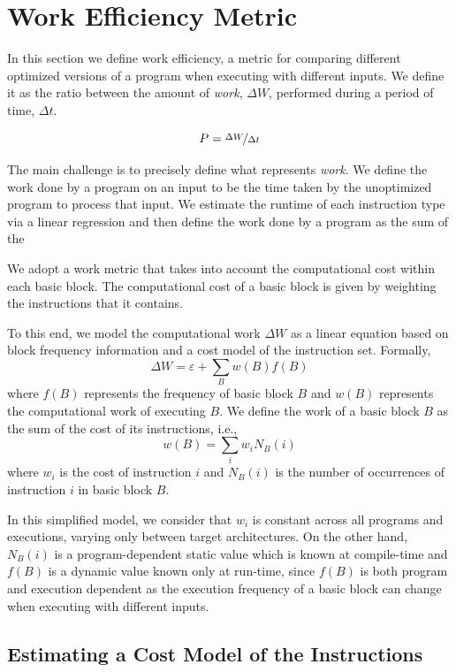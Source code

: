 \section{Work Efficiency Metric} \label{sec:metric}

In this section we define work efficiency, a metric for comparing different optimized versions of a program when executing with different
inputs. We define it as the ratio between the amount of \textit{work}, $\Delta W$, performed during a period of time, $\Delta t$.

\[
   P = \nicefrac{\Delta W}{\Delta t}
\]

The main challenge is to precisely define what represents \textit{work}. 
We define the work done by a program on an input to be the time taken by the unoptimized program to process that input.
We estimate the runtime of each instruction type via a linear regression and then define the work done by a program as the sum of the 

We adopt a work metric that takes into account the
computational cost within each basic block.
The computational cost of a basic block is given by weighting the instructions
that it contains.

To this end, we model the computational work $\Delta W$ as a linear equation based on block frequency information and a cost model of the instruction set.
Formally,
\[
\Delta W = \varepsilon + \sum_{B} w(B)f(B)
\]
where $f(B)$ represents the frequency of basic block $B$ and $w(B)$ represents the computational work of executing $B$.
We define the work of a basic block $B$ as the sum of the cost of its instructions, i.e.,
\[
w(B) = \sum_{i} w_i N_B(i)
\]
where $w_i$ is the cost of instruction $i$ and $N_B(i)$ is the number of occurrences of instruction $i$ in basic block $B$.

In this simplified model, we consider that $w_i$ is constant across all programs and executions, varying only between target architectures.
On the other hand, $N_B(i)$ is a program-dependent static value which is known at compile-time and $f(B)$ is a dynamic value known only at run-time,
since $f(B)$ is both program and execution dependent as the execution frequency of a basic block can change when executing with different inputs.

\subsection{Estimating a Cost Model of the Instructions}

